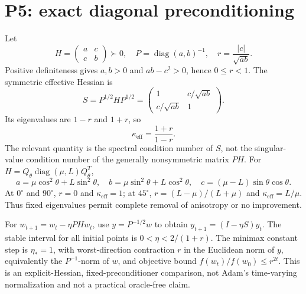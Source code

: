 \documentclass[10pt,a4paper]{article}
\begin{document}
\section{P5: exact diagonal preconditioning}
Let
\[
 H=\begin{pmatrix}a&c\\c&b\end{pmatrix}\succ0,\quad
 P=\operatorname{diag}(a,b)^{-1},\quad r=\frac{|c|}{\sqrt{ab}}.
\]
Positive definiteness gives $a,b>0$ and $ab-c^2>0$, hence $0\le r<1$.
The symmetric effective Hessian is
\[
 S=P^{1/2}HP^{1/2}=
 \begin{pmatrix}1&c/\sqrt{ab}\\c/\sqrt{ab}&1\end{pmatrix}.
\]
Its eigenvalues are $1-r$ and $1+r$, so
\begin{equation}
 \kappa_{\mathrm{eff}}=\frac{1+r}{1-r}. \label{eq:p5}
\end{equation}
The relevant quantity is the spectral condition number of $S$, not the
singular-value condition number of the generally nonsymmetric matrix $PH$.
For $H=Q_\theta\operatorname{diag}(\mu,L)Q_\theta^T$,
\[
 a=\mu\cos^2\theta+L\sin^2\theta,\quad
 b=\mu\sin^2\theta+L\cos^2\theta,\quad
 c=(\mu-L)\sin\theta\cos\theta.
\]
At $0^\circ$ and $90^\circ$, $r=0$ and $\kappa_{\mathrm{eff}}=1$;
at $45^\circ$, $r=(L-\mu)/(L+\mu)$ and $\kappa_{\mathrm{eff}}=L/\mu$.
Thus fixed eigenvalues permit complete removal of anisotropy or no improvement.

For $w_{t+1}=w_t-\eta PHw_t$, use $y=P^{-1/2}w$ to obtain
$y_{t+1}=(I-\eta S)y_t$. The stable interval for all initial points is
$0<\eta<2/(1+r)$. The minimax constant step is $\eta_*=1$,
with worst-direction contraction $r$ in the Euclidean norm of $y$, equivalently
the $P^{-1}$-norm of $w$, and objective bound
$f(w_t)/f(w_0)\le r^{2t}$. This is an explicit-Hessian, fixed-preconditioner
comparison, not Adam's time-varying normalization and not a practical oracle-free claim.
\end{document}

